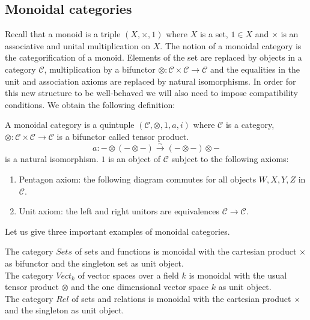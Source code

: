 \documentclass{article}
\newenvironment{definition}[1][Definition]{\begin{trivlist}
\item[\hskip \labelsep {\bfseries #1}]}{\end{trivlist}}
\newenvironment{example}[1][Example]{\begin{trivlist}
\item[\hskip \labelsep {\bfseries #1}]}{\end{trivlist}}
\begin{document}
\subsection{Monoidal categories}
Recall that a monoid is a triple $(X, \times, 1)$ where $X$ is a set, $1 \in X$ and $\times$ is an associative and unital multiplication on $X$. The notion of a monoidal category is the categorification of a monoid. Elements of the set are replaced by objects in a category $\mathcal{C}$, multiplication by a bifunctor $\otimes: \mathcal{C} \times \mathcal{C} \rightarrow \mathcal{C}$ and the equalities in the unit and association axioms are replaced by natural isomorphisms. In order for this new structure to be well-behaved we will also need to impose compatibility conditions.
We obtain the following definition:
\begin{definition}
A monoidal category is a quintuple $(\mathcal{C}, \otimes, 1, a, i)$ where $\mathcal{C}$ is a category, $\otimes: \mathcal{C} \times \mathcal{C} \rightarrow \mathcal{C}$ is a bifunctor called tensor product.
$$ a : -\otimes(- \otimes -) \xrightarrow{\sim} (-\otimes -) \otimes -$$ is a natural isomorphism. $1$ is an object of $\mathcal{C}$ subject to the following axioms:
\begin{enumerate}
    \item Pentagon axiom: the following diagram commutes for all objects $W,X,Y,Z$ in $\mathcal{C}$.
    \item Unit axiom: the left and right unitors are equivalences $\mathcal{C} \rightarrow \mathcal{C}$.
\end{enumerate}
\end{definition}
Let us give three important examples of monoidal categories.
\begin{example}
The category $Sets$ of sets and functions is monoidal with the cartesian product $\times$ as bifunctor and the singleton set as unit object.\\
The category $Vect_k$ of vector spaces over a field $k$ is monoidal with the usual tensor product $\otimes$ and the one dimensional vector space $k$ as unit object.\\
The category $Rel$ of sets and relations is monoidal with the cartesian product $\times$ and the singleton as unit object.
\end{example}
\end{document}

